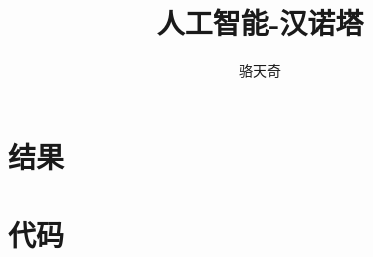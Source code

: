 \documentclass{article}
\title{人工智能-汉诺塔}
\author{骆天奇}
\date{}
\begin{document}
	\maketitle
	\section{结果}
		
	\section{代码}
		
	
\end{document}
